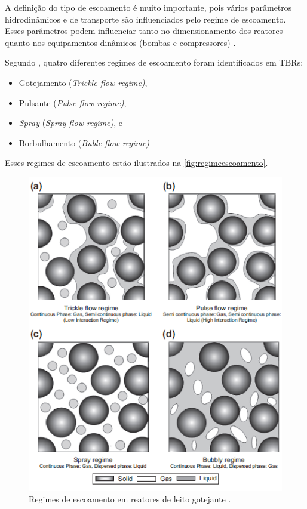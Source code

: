 A definição do tipo de escoamento é muito importante, pois vários parâmetros hidrodinâmicos e de transporte são influenciados pelo regime de escoamento. Esses parâmetros podem influenciar tanto no dimensionamento dos reatores quanto nos equipamentos dinâmicos (bombas e compressores) \cite{Ranade2011}.

Segundo , quatro diferentes regimes de escoamento foram identificados em TBRs: 

\begin{itemize}
\item Gotejamento (\emph{Trickle flow regime)},
\item Pulsante (\emph{Pulse flow regime)},
\item \emph{Spray} (\emph{Spray flow regime)}, e
\item Borbulhamento (\emph{Buble flow regime)}
\end{itemize}

Esses regimes de escoamento estão ilustrados na \autoref{fig:regimeescoamento}. 

 \begin{figure}[htb]
 \centering \includegraphics[scale=0.75]{images/Chap2/regimeescoamento.png}
 \caption{Regimes de escoamento em reatores de leito gotejante \cite{Gunjal2005}.}
 \label{fig:regimeescoamento}
 \end{figure}

